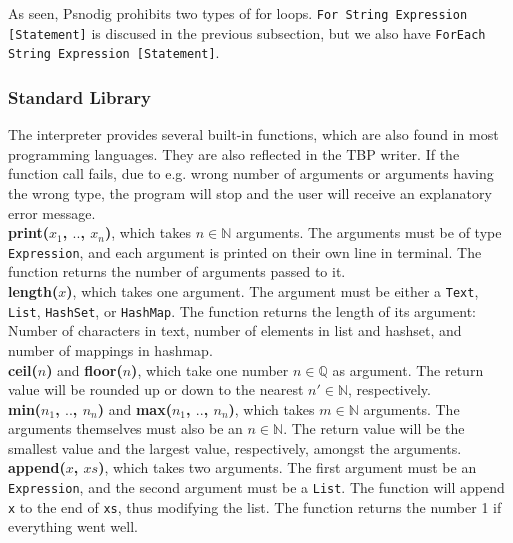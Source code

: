 As seen, Psnodig prohibits two types of for loops. \texttt{For String Expression [Statement]} is discused in the previous subsection, but we also have \texttt{ForEach String Expression [Statement]}.


\subsubsection{Standard Library}

The interpreter provides several built-in functions, which are also found in most programming languages. They are also reflected in the TBP writer. If the function call fails, due to e.g. wrong number of arguments or arguments having the wrong type, the program will stop and the user will receive an explanatory error message. \\

\textbf{print($x_{1}$, $..$, $x_{n}$)}, which takes $n \in \mathbb{N}$ arguments. The arguments must be of type \texttt{Expression}, and each argument is printed on their own line in terminal. The function returns the number of arguments passed to it. \\

\textbf{length($x$)}, which takes one argument. The argument must be either a \texttt{Text}, \texttt{List}, \texttt{HashSet}, or \texttt{HashMap}. The function returns the length of its argument: Number of characters in text, number of elements in list and hashset, and number of mappings in hashmap. \\

\textbf{ceil($n$)} and \textbf{floor($n$)}, which take one number $n \in \mathbb{Q}$ as argument. The return value will be rounded up or down to the nearest $n' \in \mathbb{N}$, respectively. \\

\textbf{min($n_{1}$, $..$, $n_{n}$)} and \textbf{max($n_{1}$, $..$, $n_{n}$)}, which takes $m \in \mathbb{N}$ arguments. The arguments themselves must also be an $n \in \mathbb{N}$. The return value will be the smallest value and the largest value, respectively, amongst the arguments. \\

\textbf{append($x$, $xs$)}, which takes two arguments. The first argument must be an \texttt{Expression}, and the second argument must be a \texttt{List}. The function will append \texttt{x} to the end of \texttt{xs}, thus modifying the list. The function returns the number 1 if everything went well. \\

